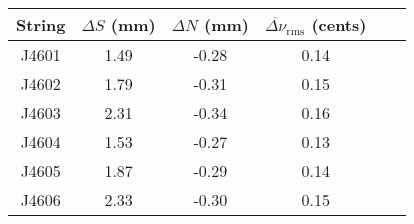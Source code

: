 \begin{tabular}{cccccc}
\toprule
String & $\Delta S$ (mm) & $\Delta N$ (mm) & $\overline{\Delta \nu}_\text{rms}$ (cents) \\
\midrule
J4601 & 1.49 & -0.28 & 0.14 \\
J4602 & 1.79 & -0.31 & 0.15 \\
J4603 & 2.31 & -0.34 & 0.16 \\
J4604 & 1.53 & -0.27 & 0.13 \\
J4605 & 1.87 & -0.29 & 0.14 \\
J4606 & 2.33 & -0.30 & 0.15 \\
\bottomrule
\end{tabular}

